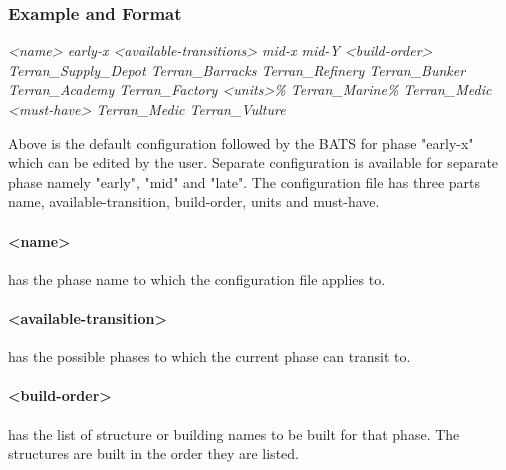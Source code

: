 \subsubsection{Example and Format}
{\it
\textless name\textgreater\newline
early-x\newline
\textless available-transitions\textgreater\newline
mid-x\newline
mid-Y\newline
\textless build-order\textgreater\newline
Terran\_Supply\_Depot\newline
Terran\_Barracks\newline
Terran\_Refinery\newline
Terran\_Bunker\newline
Terran\_Academy\newline
Terran\_Factory\newline
\textless units\textgreater{}\% Terran\_Marine\% Terran\_Medic\newline
\textless must-have\textgreater{} Terran\_Medic Terran\_Vulture\newline}

Above is the default configuration followed by the BATS for phase "early-x" which can be edited by the user. Separate configuration is available for separate phase namely "early", "mid" and "late". The configuration file has three parts name, available-transition, build-order, units and must-have. 
\paragraph{\textless name\textgreater} has the phase name to which the configuration file applies to. 
\paragraph{\textless available-transition\textgreater} has the possible phases to which the current phase can transit to. 
\paragraph{\textless build-order\textgreater} has the list of structure or building names to be built for that phase. The structures are built in the order they are listed. 
